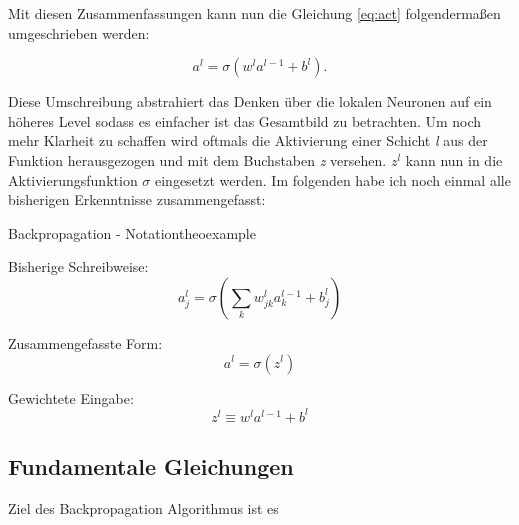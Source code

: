 Mit diesen Zusammenfassungen kann nun die Gleichung \ref{eq:act} folgendermaßen umgeschrieben werden: 

\begin{equation}
  a^{l} = \sigma(w^l a^{l-1}+b^l).
\end{equation}

Diese Umschreibung abstrahiert das Denken über die lokalen Neuronen auf ein höheres Level sodass es einfacher ist das Gesamtbild zu betrachten. Um noch mehr Klarheit zu schaffen wird oftmals die Aktivierung einer Schicht \emph{l} aus der Funktion herausgezogen und mit dem Buchstaben \emph{z} versehen. $z^l$ kann nun in die Aktivierungsfunktion $\sigma$ eingesetzt werden. Im folgenden habe ich noch einmal alle bisherigen Erkenntnisse zusammengefasst: 

\begin{mytheo}{Backpropagation - Notation}{theoexample}

Bisherige Schreibweise:
\begin{equation}
  a^{l}_j = \sigma\left( \sum_k w^{l}_{jk} a^{l-1}_k + b^l_j \right) \nonumber
\end{equation}

Zusammengefasste Form:
\begin{equation}
a^l = \sigma(z^l)
\end{equation}

Gewichtete Eingabe:
\begin{equation}
  z^l \equiv w^l a^{l-1}+b^l
\end{equation}

\end{mytheo}

\subsection{Fundamentale Gleichungen}

Ziel des Backpropagation Algorithmus ist es 